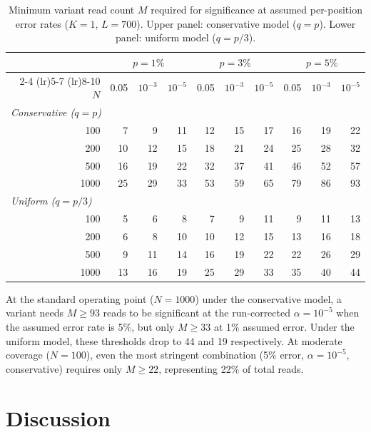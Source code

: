 \documentclass[11pt]{article}
\begin{document}
\begin{table}[htbp]
\centering
\caption{Minimum variant read count $M$ required for significance at assumed
per-position error rates ($K = 1$, $L = 700$). Upper panel: conservative model
($q = p$). Lower panel: uniform model ($q = p/3$).}
\label{tab:min_M}
\small
\begin{tabular}{r rrr rrr rrr}
\toprule
 & \multicolumn{3}{c}{$p = 1\%$}
 & \multicolumn{3}{c}{$p = 3\%$}
 & \multicolumn{3}{c}{$p = 5\%$} \\
\cmidrule(lr){2-4} \cmidrule(lr){5-7} \cmidrule(lr){8-10}
$N$ & 0.05 & $10^{-3}$ & $10^{-5}$
    & 0.05 & $10^{-3}$ & $10^{-5}$
    & 0.05 & $10^{-3}$ & $10^{-5}$ \\
\midrule
\multicolumn{10}{l}{\emph{Conservative ($q = p$)}} \\[2pt]
100  &  7 &  9 & 11 & 12 & 15 & 17 & 16 & 19 & 22 \\
200  & 10 & 12 & 15 & 18 & 21 & 24 & 25 & 28 & 32 \\
500  & 16 & 19 & 22 & 32 & 37 & 41 & 46 & 52 & 57 \\
1000 & 25 & 29 & 33 & 53 & 59 & 65 & 79 & 86 & 93 \\
\midrule
\multicolumn{10}{l}{\emph{Uniform ($q = p/3$)}} \\[2pt]
100  &  5 &  6 &  8 &  7 &  9 & 11 &  9 & 11 & 13 \\
200  &  6 &  8 & 10 & 10 & 12 & 15 & 13 & 16 & 18 \\
500  &  9 & 11 & 14 & 16 & 19 & 22 & 22 & 26 & 29 \\
1000 & 13 & 16 & 19 & 25 & 29 & 33 & 35 & 40 & 44 \\
\bottomrule
\end{tabular}
\end{table}

At the standard operating point ($N = 1000$) under the conservative model, a
variant needs $M \geq 93$ reads to be significant at the run-corrected
$\alpha = 10^{-5}$ when the assumed error rate is 5\%, but only $M \geq 33$ at
1\% assumed error. Under the uniform model, these thresholds drop to 44 and 19
respectively. At moderate coverage ($N = 100$), even the most stringent
combination (5\% error, $\alpha = 10^{-5}$, conservative) requires only
$M \geq 22$, representing 22\% of total reads.

\section{Discussion}
\end{document}
